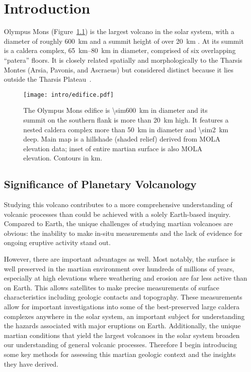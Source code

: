 \chapter{Introduction}

Olympus Mons (Figure~\ref{fig:edifice}) is the largest volcano in the solar system, with a diameter of roughly \qty{600}{\km} and a summit height of over \qty{20}{\km} \parencite[e.g.,][]{plescia_morphometric_2004}. At its summit is a caldera complex, \qtyrange{65}{80}{\km} in diameter, comprised of six overlapping ``patera'' floors. It is closely related spatially and morphologically to the Tharsis Montes (Arsia, Pavonis, and Ascraeus) but considered distinct because it lies outside the Tharsis Plateau~\parencite[e.g.,][]{carr_volcanism_1973}.

\begin{figure}
    \centering
    \texttt{[image: intro/edifice.pdf]}
    \caption[Olympus Mons]{The Olympus Mons edifice is \qty{\sim600}{\km} in diameter and its summit on the southern flank is more than \qty{20}{\km} high. It features a nested caldera complex more than \qty{50}{\km} in diameter and \qty{\sim2}{\km} deep. Main map is a hillshade (shaded relief) derived from \acf{MOLA} elevation data\parencite{smith_mars_2001}; inset of entire martian surface is also \acs{MOLA} elevation. Contours in \unit{\km}.}\label{fig:edifice}
\end{figure}

\section{Significance of Planetary Volcanology}

Studying this volcano contributes to a more comprehensive understanding of volcanic processes than could be achieved with a solely Earth-based inquiry. Compared to Earth, the unique challenges of studying martian volcanoes are obvious: the inability to make in-situ measurements and the lack of evidence for ongoing eruptive activity stand out. 

However, there are important advantages as well. Most notably, the surface is well preserved in the martian environment over hundreds of millions of years, especially at high elevations where weathering and erosion are far less active than on Earth. This allows satellites to make precise measurements of surface characteristics including geologic contacts and topography. These measurements allow for important investigations into some of the best-preserved large caldera complexes anywhere in the solar system, an important subject for understanding the hazards associated with major eruptions on Earth. Additionally, the unique martian conditions that yield the largest volcanoes in the solar system broaden our understanding of general volcanic processes. Therefore I begin introducing some key methods for assessing this martian geologic context and the insights they have derived.

